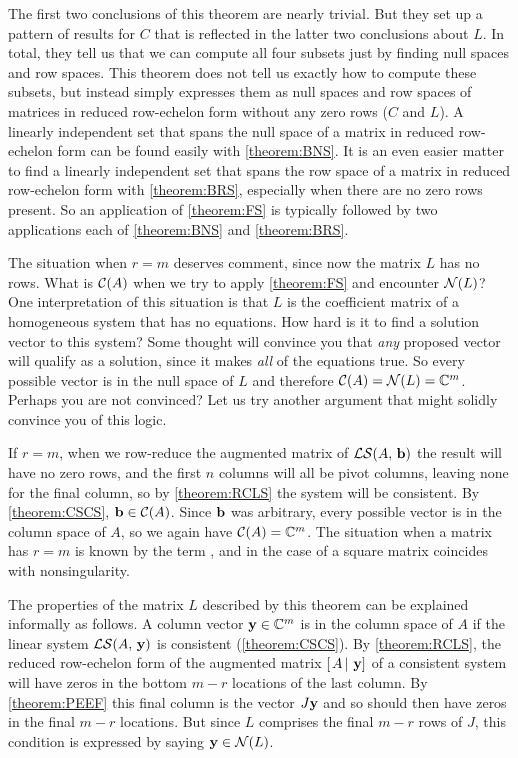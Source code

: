 \documentclass{ximera}
\begin{document}
The first two conclusions of this theorem are nearly trivial.  But
they set up a pattern of results for $C$ that is reflected in the
latter two conclusions about $L$.  In total, they tell us that we can
compute all four subsets just by finding null spaces and row spaces.
This theorem does not tell us exactly how to compute these subsets,
but instead simply expresses them as null spaces and row spaces of
matrices in reduced row-echelon form without any zero rows ($C$ and
$L$).  A linearly independent set that spans the null space of a
matrix in reduced row-echelon form can be found easily with
\ref{theorem:BNS}.  It is an even easier matter to find a linearly
independent set that spans the row space of a matrix in reduced
row-echelon form with \ref{theorem:BRS}, especially when there are no
zero rows present.  So an application of \ref{theorem:FS} is typically
followed by two applications each of \ref{theorem:BNS} and
\ref{theorem:BRS}.

The situation when $r=m$ deserves comment, since now the matrix $L$
has no rows.  What is $\mathcal{C}\!\left(A\right)$ when we try to apply \ref{theorem:FS}
and encounter $\mathcal{N}\!\left(L\right)$?  One interpretation of this situation is that
$L$ is the coefficient matrix of a homogeneous system that has no
equations.  How hard is it to find a solution vector to this system?
Some thought will convince you that \textit{any} proposed vector will
qualify as a solution, since it makes \textit{all} of the equations
true.  So every possible vector is in the null space of $L$ and
therefore $\mathcal{C}\!\left(A\right)=\mathcal{N}\!\left(L\right)=\mathbb{C}^{m}$.  Perhaps you are not
convinced?  Let us try another argument that might solidly convince
you of this logic.

If $r=m$, when we row-reduce the augmented matrix of
$\mathcal{LS}\!\left(A,\,\mathbf{b}\right)$ the result will have no zero rows, and
the first $n$ columns will all be pivot columns, leaving none for the
final column, so by \ref{theorem:RCLS} the system will be consistent.
By \ref{theorem:CSCS}, $\mathbf{b}\in\mathcal{C}\!\left(A\right)$.  Since $\mathbf{b}$ was
arbitrary, every possible vector is in the column space of $A$, so we
again have $\mathcal{C}\!\left(A\right)=\mathbb{C}^{m}$.  The situation when a matrix has
$r=m$ is known by the term , and in the case of a
square matrix coincides with nonsingularity.

The properties of the matrix $L$ described by this theorem can be
explained informally as follows.  A column vector
$\mathbf{y}\in\mathbb{C}^{m}$ is in the column space of $A$ if the linear
system $\mathcal{LS}\!\left(A,\,\mathbf{y}\right)$ is consistent
(\ref{theorem:CSCS}).  By \ref{theorem:RCLS}, the reduced row-echelon
form of the augmented matrix $\left\lbrack\left.A\,\right\rvert\,\mathbf{y}\right\rbrack$ of a consistent
system will have zeros in the bottom $m-r$ locations of the last
column.  By \ref{theorem:PEEF} this final column is the vector
$J\mathbf{y}$ and so should then have zeros in the final $m-r$
locations.  But since $L$ comprises the final $m-r$ rows of $J$, this
condition is expressed by saying $\mathbf{y}\in\mathcal{N}\!\left(L\right)$.
\end{document}
